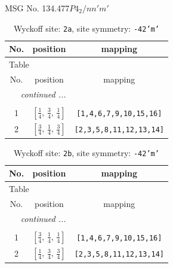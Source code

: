 \documentclass[fleqn,8pt]{jsarticle}
\begin{document}
\setcounter{MaxMatrixCols}{32}

\renewcommand{\tablename}{Table~}
\renewcommand{\figurename}{Figure~}
\begin{center}
\LARGE
MSG No. 134.477\quad$P4_{2}/nn'm'$
\end{center}
\renewcommand{\arraystretch}{1.2}
\begin{longtable}{ccc}
\caption{Wyckoff site: {\tt 2a}, site symmetry: {\tt -42'm'}}
 \\
 \hline \hline
No. & position & mapping \\ \hline \endfirsthead

\multicolumn{2}{l}{\tablename\ \thetable{}} \\
 \hline \hline
No. & position & mapping \\ \hline \endhead

 \hline \hline
\multicolumn{2}{r}{\footnotesize\it continued ...} \\ \endfoot

 \hline \hline
\multicolumn{2}{r}{} \\ \endlastfoot

1 & $\left[ \frac{1}{4},\, \frac{3}{4},\, \frac{1}{4} \right]$ & {\tt [1,4,6,7,9,10,15,16]} \\ \hline
2 & $\left[ \frac{3}{4},\, \frac{1}{4},\, \frac{3}{4} \right]$ & {\tt [2,3,5,8,11,12,13,14]} \\
\end{longtable}
\renewcommand{\arraystretch}{1.2}
\begin{longtable}{ccc}
\caption{Wyckoff site: {\tt 2b}, site symmetry: {\tt -42'm'}}
 \\
 \hline \hline
No. & position & mapping \\ \hline \endfirsthead

\multicolumn{2}{l}{\tablename\ \thetable{}} \\
 \hline \hline
No. & position & mapping \\ \hline \endhead

 \hline \hline
\multicolumn{2}{r}{\footnotesize\it continued ...} \\ \endfoot

 \hline \hline
\multicolumn{2}{r}{} \\ \endlastfoot

1 & $\left[ \frac{3}{4},\, \frac{1}{4},\, \frac{1}{4} \right]$ & {\tt [1,4,6,7,9,10,15,16]} \\ \hline
2 & $\left[ \frac{1}{4},\, \frac{3}{4},\, \frac{3}{4} \right]$ & {\tt [2,3,5,8,11,12,13,14]} \\
\end{longtable}
\end{document}
